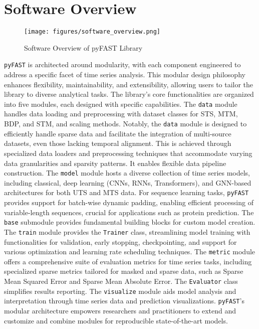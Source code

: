 \documentclass[twoside,11pt]{article}
\begin{document}
\section{Software Overview}
\begin{figure}[htbp]
    \centering
    \texttt{[image: figures/software\_overview.png]}
    \caption{Software Overview of pyFAST Library}
    \label{fig:software_overview}
\end{figure}
\texttt{pyFAST} is architected around modularity, with each component engineered to address a specific facet of time series analysis. This modular design philosophy enhances flexibility, maintainability, and extensibility, allowing users to tailor the library to diverse analytical tasks. The library’s core functionalities are organized into five modules, each designed with specific capabilities. The \texttt{data} module handles data loading and preprocessing with dataset classes for STS, MTM, BDP, and STM, and scaling methods. Notably, the \texttt{data} module is designed to efficiently handle sparse data and facilitate the integration of multi-source datasets, even those lacking temporal alignment. This is achieved through specialized data loaders and preprocessing techniques that accommodate varying data granularities and sparsity patterns. It enables flexible data pipeline construction. The \texttt{model} module hosts a diverse collection of time series models, including classical, deep learning (CNNs, RNNs, Transformers), and GNN-based architectures for both UTS and MTS data. For sequence learning tasks, \texttt{pyFAST} provides support for batch-wise dynamic padding, enabling efficient processing of variable-length sequences, crucial for applications such as protein prediction. The \texttt{base} submodule provides fundamental building blocks for custom model creation. The \texttt{train} module provides the \texttt{Trainer} class, streamlining model training with functionalities for validation, early stopping, checkpointing, and support for various optimization and learning rate scheduling techniques. The \texttt{metric} module offers a comprehensive suite of evaluation metrics for time series tasks, including specialized sparse metrics tailored for masked and sparse data, such as Sparse Mean Squared Error and Sparse Mean Absolute Error. The \texttt{Evaluator} class simplifies results reporting. The \texttt{visualize} module aids model analysis and interpretation through time series data and prediction visualizations. \texttt{pyFAST}'s modular architecture empowers researchers and practitioners to extend and customize and combine modules for reproducible state-of-the-art models.
\end{document}
